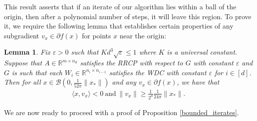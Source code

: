 \documentclass[11pt]{article}
\renewcommand{\epsilon}{\varepsilon}
\newcommand{\R}{\mathbb{R}}
\newcommand{\G}{G}
\newtheorem{lem}{Lemma}
\theoremstyle{remark}
\begin{document}
 
 This result asserts that if an iterate of our algorithm lies within a ball of the origin, then after a polynomial number of steps, it will leave this region. To prove it, we require the following lemma that establishes certain properties of any subgradient $v_x \in \partial f(x)$ for points $x$ near the origin: \begin{lem} \label{neg_inner_prod_lower_bd_grad}
Fix $\epsilon > 0$ such that $Kd^3 \sqrt{\epsilon} \leqslant 1$ where $K$ is a universal constant. Suppose that $A \in \R^{m \times n_d}$ satisfies the RRCP with respect to $\G$ with constant $\epsilon$ and $\G$ is such that each $W_i \in \R^{n_i \times n_{i-1}}$ satisfies the WDC with constant $\epsilon$ for $i \in [d]$. Then for all $x \in \mathcal{B}(0,\frac{1}{52\pi}\|x_*\|)$ and any $v_x \in \partial f(x)$, we have that \begin{align}
\langle x,v_x \rangle < 0\ \text{and}\ \|v_x\| \geqslant \frac{1}{2^d}\frac{1}{24\pi}\|x_*\|. \nonumber
\end{align} 
\end{lem} \noindent We are now ready to proceed with a proof of Proposition \ref{bounded_iterates}.
\end{document}

